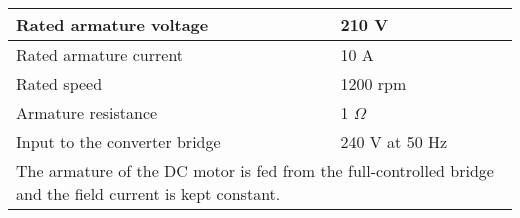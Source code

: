 \begin{tabular}{|m{8cm}|m{4cm}|}
\hline
Rated armature voltage & 210 V \\
\hline
Rated armature current & 10 A \\
\hline
Rated speed & 1200 rpm \\
\hline
Armature resistance & 1 $\Omega$ \\
\hline
Input to the converter bridge & 240 V at 50 Hz \\
\hline
\multicolumn{2}{|m{12cm}|}{The armature of the DC motor is fed from the full-controlled bridge and the field current is kept constant.} \\
\hline
\end{tabular}
